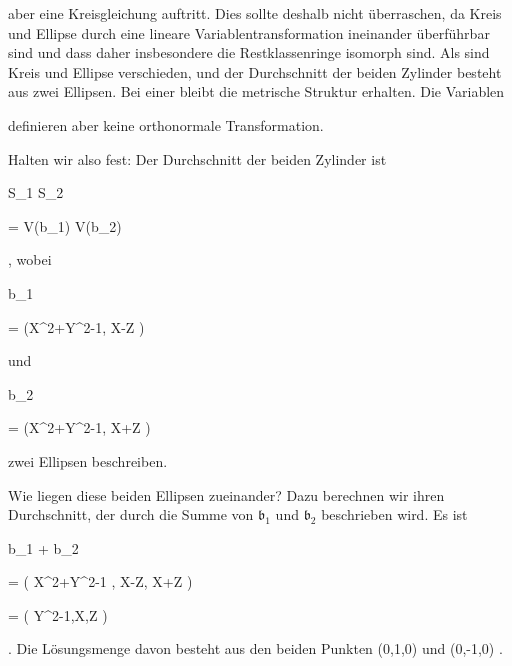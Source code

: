 { aber eine Kreisgleichung auftritt. Dies sollte deshalb nicht überraschen, da Kreis und Ellipse durch eine lineare Variablentransformation ineinander überführbar sind und dass daher insbesondere die Restklassenringe isomorph sind. Als  {} sind Kreis und Ellipse verschieden, und der Durchschnitt der beiden Zylinder besteht aus zwei Ellipsen. Bei einer  {} bleibt die metrische Struktur erhalten. Die Variablen


 definieren aber keine orthonormale Transformation.


Halten wir also fest: Der Durchschnitt der beiden Zylinder ist


\mavergleichskettedisp


{\vergleichskette


{ S_1 \cap S_2
}


{ =} { V({\mathfrak b}_1) \cup V({\mathfrak b}_2)
}


{ } {
}


{ } {
}


{ } {
}


}
{}{}{,}
wobei


\mavergleichskette


{\vergleichskette


{ {\mathfrak b}_1
}


{ = }{ (X^2+Y^2-1, X-Z )
}


{  }{
}


{    }{
}


{   }{
}


}
{}{}{}
und


\mavergleichskette


{\vergleichskette


{ {\mathfrak b}_2
}


{ = }{ (X^2+Y^2-1, X+Z )
}


{  }{
}


{    }{
}


{   }{
}


}
{}{}{}
zwei Ellipsen beschreiben.


Wie liegen diese beiden Ellipsen zueinander? Dazu berechnen wir ihren Durchschnitt, der durch die Summe von ${\mathfrak b}_1$ und ${\mathfrak b}_2$ beschrieben wird. Es ist


\mavergleichskettedisp


{\vergleichskette


{ {\mathfrak b}_1 + {\mathfrak b}_2
}


{ =} { \left(  X^2+Y^2-1 , X-Z, X+Z  \right)
}


{ =} { \left(  Y^2-1,X,Z  \right)
}


{ } {
}


{ } {
}


}
{}{}{.}
Die Lösungsmenge davon besteht aus den beiden Punkten
\mathkor {} {(0,1,0)} {und} {(0,-1,0)} {.}


}


